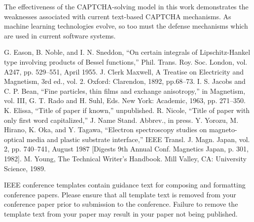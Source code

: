 \documentclass[11pt,conference]{IEEEtran}
\begin{document}
The effectiveness of the CAPTCHA-solving model in this work demonstrates the
weaknesses associated with current text-based CAPTCHA mechanisms. As machine
learning technologies evolve, so too must the defense mechanisms which are used
in current software systems.

\begin{thebibliography}{00}
	 G. Eason, B. Noble, and I. N. Sneddon, ``On certain integrals of Lipschitz-Hankel type involving products of Bessel functions,'' Phil. Trans. Roy. Soc. London, vol. A247, pp. 529--551, April 1955.
	 J. Clerk Maxwell, A Treatise on Electricity and Magnetism, 3rd ed., vol. 2. Oxford: Clarendon, 1892, pp.68--73.
	 I. S. Jacobs and C. P. Bean, ``Fine particles, thin films and exchange anisotropy,'' in Magnetism, vol. III, G. T. Rado and H. Suhl, Eds. New York: Academic, 1963, pp. 271--350.
	 K. Elissa, ``Title of paper if known,'' unpublished.
	 R. Nicole, ``Title of paper with only first word capitalized,'' J. Name Stand. Abbrev., in press.
	 Y. Yorozu, M. Hirano, K. Oka, and Y. Tagawa, ``Electron spectroscopy studies on magneto-optical media and plastic substrate interface,'' IEEE Transl. J. Magn. Japan, vol. 2, pp. 740--741, August 1987 [Digests 9th Annual Conf. Magnetics Japan, p. 301, 1982].
	 M. Young, The Technical Writer's Handbook. Mill Valley, CA: University Science, 1989.
\end{thebibliography}
\vspace{12pt}
\color{red}
IEEE conference templates contain guidance text for composing and formatting conference papers. Please ensure that all template text is removed from your conference paper prior to submission to the conference. Failure to remove the template text from your paper may result in your paper not being published.
\end{document}
